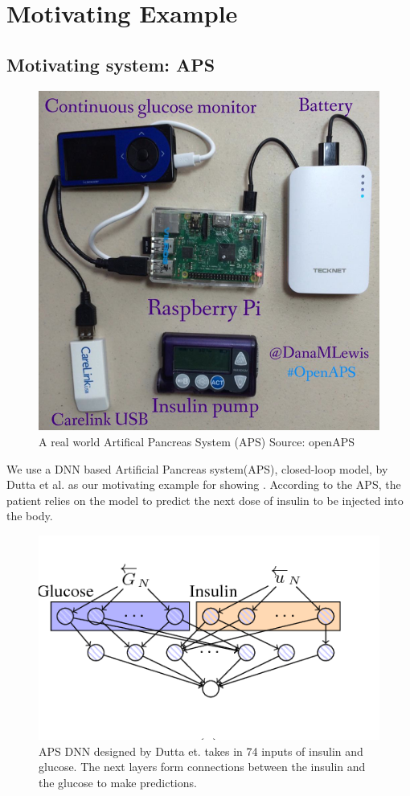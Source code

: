 \chapter{Motivating Example}
\label{ch:Chapter2}
\section{Motivating system: APS}

\begin{figure}
	\centering
	\includegraphics[width=0.7\linewidth]{Images/APSrig}
	\caption{A real world Artifical Pancreas System (APS) Source: openAPS}
	\label{fig:apsrig}
\end{figure}
We use a DNN based Artificial Pancreas system(APS), closed-loop model, by Dutta et al. \cite{10.1007/978-3-319-99429-1_11}  as our motivating example for showing \attack. According to the APS, the patient relies on the model to predict the next dose of insulin to be injected into the body. 


\begin{figure}
	\centering
	\includegraphics[width=0.7\linewidth, height=0.3\linewidth]{Images/APSDNN}
	\caption[APS DNN]{APS DNN designed by Dutta et. takes in 74 inputs of insulin and glucose. The next layers form connections between the insulin and the glucose to make predictions.}
	\label{fig:apsdnn}
\end{figure}

